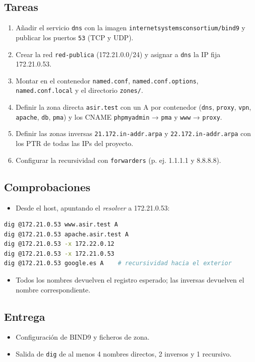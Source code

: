 \documentclass[11pt]{article}
\begin{document}
\subsection{Tareas}
\label{sec:org000002a}
\begin{enumerate}
\item Añadir el servicio \texttt{dns} con la imagen \texttt{internetsystemsconsortium/bind9} y
publicar los puertos \texttt{53} (TCP y UDP).
\item Crear la red \texttt{red-publica} (172.21.0.0/24) y asignar a \texttt{dns} la IP fija
172.21.0.53.
\item Montar en el contenedor \texttt{named.conf}, \texttt{named.conf.options}, \texttt{named.conf.local}
y el directorio \texttt{zones/}.
\item Definir la zona directa \texttt{asir.test} con un A por contenedor (\texttt{dns}, \texttt{proxy},
\texttt{vpn}, \texttt{apache}, \texttt{db}, \texttt{pma}) y los CNAME \texttt{phpmyadmin} → \texttt{pma} y \texttt{www} → \texttt{proxy}.
\item Definir las zonas inversas \texttt{21.172.in-addr.arpa} y \texttt{22.172.in-addr.arpa} con
los PTR de todas las IPs del proyecto.
\item Configurar la recursividad con \texttt{forwarders} (p. ej. 1.1.1.1 y 8.8.8.8).
\end{enumerate}
\subsection{Comprobaciones}
\label{sec:org000002d}
\begin{itemize}
\item Desde el host, apuntando el \emph{resolver} a 172.21.0.53:
\end{itemize}

\begin{lstlisting}[language=bash,numbers=none]
dig @172.21.0.53 www.asir.test A
dig @172.21.0.53 apache.asir.test A
dig @172.21.0.53 -x 172.22.0.12
dig @172.21.0.53 -x 172.21.0.53
dig @172.21.0.53 google.es A    # recursividad hacia el exterior
\end{lstlisting}
\begin{itemize}
\item Todos los nombres devuelven el registro esperado; las inversas devuelven el
nombre correspondiente.
\end{itemize}
\subsection{Entrega}
\label{sec:org0000030}
\begin{itemize}
\item Configuración de BIND9 y ficheros de zona.
\item Salida de \texttt{dig} de al menos 4 nombres directos, 2 inversos y 1 recursivo.
\end{itemize}
\end{document}

